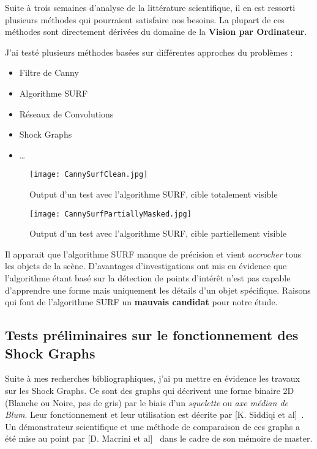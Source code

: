 Suite à trois semaines d'analyse de la littérature scientifique, il en est ressorti plusieurs méthodes qui pourraient satisfaire nos besoins. La plupart de ces méthodes sont directement dérivées du domaine de la \textbf{Vision par Ordinateur}.

J'ai testé plusieurs méthodes basées sur différentes approches du problèmes :
\begin{itemize}
	\item Filtre de Canny
	\item Algorithme SURF
	\item Réseaux de Convolutions
	\item Shock Graphs
	\item \ldots
\end{itemize}
\vspace{3mm}

\begin{figure}[H]
    \centering
    \texttt{[image: CannySurfClean.jpg]}
	\caption{Output d'un test avec l'algorithme SURF, cible totalement visible} 
\end{figure}
\vspace{-6mm}

\begin{figure}[H]
    \centering
    \texttt{[image: CannySurfPartiallyMasked.jpg]}
	\caption{Output d'un test avec l'algorithme SURF, cible partiellement visible}\label{image.CannySurfPartiallyMasked} 
\end{figure}
\vspace{-6mm}

Il apparait que l'algorithme SURF manque de précision et vient \textit{accrocher} tous les objets de la scène. D'avantages d'investigations ont mis en évidence que l'algorithme étant basé sur la détection de points d'intérêt n'est pas capable d'apprendre une forme mais uniquement les détails d'un objet spécifique. Raisons qui font de l'algorithme SURF un \textbf{mauvais candidat} pour notre étude.

\clearpage
\subsection{Tests préliminaires sur le fonctionnement des Shock Graphs}

Suite à mes recherches bibliographiques, j'ai pu mettre en évidence les travaux sur les Shock Graphs. Ce sont des graphs qui décrivent une forme binaire 2D (Blanche ou Noire, pas de gris) par le biais d'un \textit{squelette} ou \textit{axe médian de Blum}. Leur fonctionnement et leur utilisation est décrite par [K. Siddiqi et al]~\cite{Siddiqi1999}. Un démonstrateur scientifique et une méthode de comparaison de ces graphs a été mise au point par [D. Macrini et al]~\cite{Macrini2002} dans le cadre de son mémoire de master.

